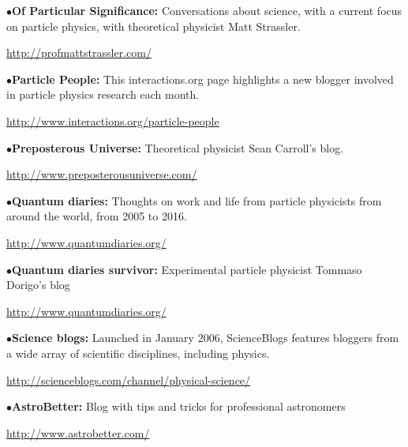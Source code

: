 \medskip

\item{$\bullet$}{\bf Of Particular Significance:}
Conversations about science, with a current focus on particle physics, with theoretical physicist Matt Strassler.
	\item{}\qquad\url{http://profmattstrassler.com/}

\medskip

\item{$\bullet$}{\bf Particle People:}
This interactions.org page highlights a new blogger involved in particle physics research each month.
	\item{}\qquad\url{http://www.interactions.org/particle-people}

\medskip

\item{$\bullet$}{\bf Preposterous Universe:}
Theoretical physicist Sean Carroll's blog.
	\item{}\qquad\url{http://www.preposterousuniverse.com/}

\medskip

\item{$\bullet$}{\bf Quantum diaries:}
Thoughts on work and life from particle physicists from around the world, from 2005 to 2016.
	\item{}\qquad\url{http://www.quantumdiaries.org/}


\medskip

\item{$\bullet$}{\bf Quantum diaries survivor:}
Experimental particle physicist Tommaso Dorigo’s blog
	\item{}\qquad\url{http://www.quantumdiaries.org/}

\medskip

\item{$\bullet$}{\bf Science blogs:}
Launched in January 2006, ScienceBlogs features bloggers from a wide array of scientific disciplines, including physics.
	\item{}\qquad\url{http://scienceblogs.com/channel/physical-science/}

\medskip

\item{$\bullet$}{\bf AstroBetter:}
Blog with tips and tricks for professional astronomers
	\item{}\qquad\url{http://www.astrobetter.com/}


\medskip


\endRPPonly



